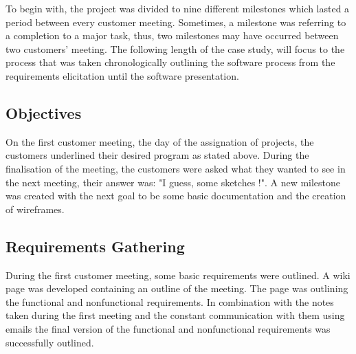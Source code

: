 \documentclass{l3proj}
\begin{document}
To begin with, the project was divided to nine different milestones which lasted a period between every customer meeting. Sometimes, a milestone was referring to a completion to a major task, thus, two milestones may have occurred between two customers' meeting. The following length of the case study, will focus to the process that was taken chronologically outlining the software process from the requirements elicitation until the software presentation.

\subsection{Objectives}
\label{objectives}

On the first customer meeting, the day of the assignation of projects, the customers underlined their desired program as stated above. During the finalisation of the meeting, the customers were asked what they wanted to see in the next meeting, their answer was: "I guess, some sketches !". A new milestone was created with the next goal to be some basic documentation and the creation of wireframes.

\subsection{Requirements Gathering}
\label{requirements}

During the first customer meeting, some basic requirements were outlined. A wiki page was developed containing an outline of the meeting. The page was outlining the functional and nonfunctional requirements. In combination with the notes taken during the first meeting and the constant communication with them using emails the final version of the functional and nonfunctional requirements was successfully outlined.
\end{document}
